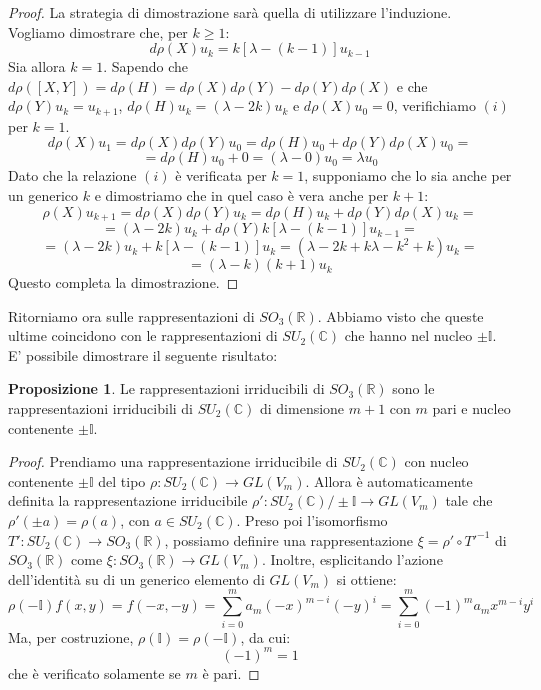 \documentclass[12pt,a4paper]{report}
\theoremstyle{definition}
\theoremstyle{Theorem}
\newtheorem{Prop}[Def]{Proposizione}
\theoremstyle{definition}
\theoremstyle{definition}
\theoremstyle{definition}
\begin{document}
\begin{proof}
	La strategia di dimostrazione sarà quella di utilizzare l'induzione.
	Vogliamo dimostrare che, per $k\geq 1$:
	\begin{equation}
		\label{eq:4}
		d\rho(X)u_k=k[\lambda-(k-1)]u_{k-1} 
\tag{i}
\end{equation}
	Sia allora $k=1$. Sapendo che $d\rho([X,Y])=d\rho(H)=d\rho(X)d\rho(Y)-d\rho(Y)d\rho(X)$ e che $d\rho(Y)u_k=u_{k+1}$, $d\rho(H)u_k=(\lambda-2k)u_k$ e $d\rho(X)u_0=0$, verifichiamo $(i)$ per $k=1$.
	$$d\rho(X)u_1=d\rho(X)d\rho(Y)u_0=d\rho(H)u_0+d\rho(Y)d\rho(X)u_0=$$$$=d\rho(H)u_0+0=(\lambda-0)u_0=\lambda u_0$$
	Dato che la relazione $(i)$ è verificata per $k=1$, supponiamo che lo sia anche per un generico $k$ e dimostriamo che in quel caso è vera anche per $k+1$:
	$$\rho(X)u_{k+1}=d\rho(X)d\rho(Y)u_{k}=d\rho(H)u_k+d\rho(Y)d\rho(X)u_k=$$
	$$=(\lambda-2k)u_k+d\rho(Y)k[\lambda-(k-1)]u_{k-1}=$$ 
	$$=(\lambda-2k)u_k+k[\lambda-(k-1)]u_{k}=(\lambda-2k+k\lambda-k^2+k)u_k=$$
	$$=(\lambda-k)(k+1)u_k$$
	Questo completa la dimostrazione.
\end{proof}
Ritorniamo ora sulle rappresentazioni di $SO_3(\mathbb{R})$. Abbiamo visto che queste ultime coincidono con le rappresentazioni di $SU_2(\mathbb{C})$ che hanno nel nucleo $\pm\mathbb{I}$. E' possibile dimostrare il seguente risultato:
\begin{Prop}
	Le rappresentazioni irriducibili di $SO_3(\mathbb{R})$ sono le rappresentazioni irriducibili di $SU_2(\mathbb{C})$ di dimensione $m+1$ con $m$ pari e nucleo contenente $\pm\mathbb{I}$.
\end{Prop}
\begin{proof}
	Prendiamo una rappresentazione irriducibile di $SU_2(\mathbb{C})$ con nucleo contenente $\pm\mathbb{I}$ del tipo $\rho:SU_2(\mathbb{C})\rightarrow GL(V_m)$. Allora è automaticamente definita la rappresentazione irriducibile $\rho':SU_2(\mathbb{C})/\pm\mathbb{I}\rightarrow GL(V_m)$ tale che $\rho'(\pm a)=\rho(a)$, con $a\in SU_2(\mathbb{C})$. Preso poi l'isomorfismo $T':SU_2(\mathbb{C})\rightarrow SO_3(\mathbb{R})$, possiamo definire una rappresentazione $\xi=\rho'\circ T'^{-1}$ di $SO_3(\mathbb{R})$ come $\xi:SO_3(\mathbb{R})\rightarrow GL(V_m)$.
	Inoltre, esplicitando l'azione dell'identità su di un generico elemento di $GL(V_m)$ si ottiene: $$\rho(-\mathbb{I})f(x,y)=f(-x,-y)=\sum_{i=0}^{m}a_m(-x)^{m-i}(-y)^i=\sum_{i=0}^{m}(-1)^ma_mx^{m-i}y^i$$
	Ma, per costruzione, $\rho(\mathbb{I})=\rho(-\mathbb{I})$, da cui:
	$$(-1)^m=1$$
	che è verificato solamente se $m$ è pari.
\end{proof}
\end{document}
